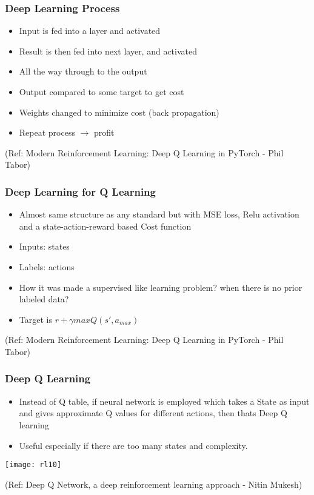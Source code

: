 \begin{frame}[fragile]\frametitle{Deep Learning Process}


\begin{itemize}
\item Input is fed into a layer and activated 
\item Result is then fed into next layer, and activated 
\item All the way through to the output
\item Output compared to some target to get cost 
\item  Weights changed to minimize cost (back propagation)
\item Repeat process $\rightarrow$ profit
\end{itemize}

{\tiny (Ref: Modern Reinforcement Learning: Deep Q Learning in PyTorch - Phil Tabor)}

\end{frame}

\begin{frame}[fragile]\frametitle{Deep Learning for Q Learning}


\begin{itemize}
\item Almost same structure as any standard but with MSE loss, Relu activation and a state-action-reward based Cost function
\item Inputs: states
\item Labels: actions
\item How it was made a supervised like learning problem? when there is no prior labeled data?
\item Target is $r + \gamma max Q(s',a_{max})$
\end{itemize}

{\tiny (Ref: Modern Reinforcement Learning: Deep Q Learning in PyTorch - Phil Tabor)}

\end{frame}


\begin{frame}[fragile]\frametitle{Deep Q Learning}

\begin{itemize}
\item Instead of Q table, if neural network is employed which takes a State as input and gives approximate Q values for different actions, then thats Deep Q learning
\item Useful especially if there are too many states and complexity.
\end{itemize}

\begin{center}
\texttt{[image: rl10]}
\end{center}

{\tiny (Ref: Deep Q Network, a deep reinforcement learning approach - Nitin Mukesh)}
\end{frame}


